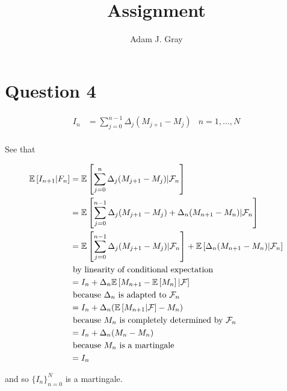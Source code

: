 \documentclass{unswmaths}
\begin{document}
\author{Adam J. Gray}
\subject{Number Theory}
\title{Assignment}

\unswtitle

\section{Question 4}

\begin{align*}
	I_n &= \sum_{j=0}^{n-1} \Delta_j (M_{j+1} - M_j) & n = 1,\ldots, N \\
\end{align*}

See that

\begin{align*}
	\mathbb{E} \left[ I_{n+1} | F_n  \right] &= \mathbb{E} \left[ \sum_{j=0}^{n} \Delta_j (M_{j+1} - M_j) | \mathcal{F}_n \right] \\
		&= \mathbb{E} \left[ \sum_{j=0}^{n-1} \Delta_j (M_{j+1} - M_j) + \Delta_n(M_{n+1} - M_{n}) | \mathcal{F}_n \right] \\
		&= \mathbb{E} \left[ \sum_{j=0}^{n-1} \Delta_j (M_{j+1} - M_j) | \mathcal{F}_n \right] + \mathbb{E} \left[ \Delta_n(M_{n+1} - M_{n}) | \mathcal{F}_n \right] \\
		& \text{ by linearity of conditional expectation } \\
		&= I_n + \Delta_n \mathbb{E} \left[ M_{n+1} - \mathbb{E} \left[ M_n \right] | \mathcal{F} \right] \\
		& \text{ because } \Delta_n \text{ is adapted to } \mathcal{F}_n \\
		&= I_n + \Delta_n (\mathbb{E} \left[ M_{n+1} | \mathcal{F} \right] - M_n) \\
		& \text{ because } M_n \text{ is completely determined by } \mathcal{F}_n \\
		&= I_n + \Delta_n (M_n - M_n) \\
		& \text{ because } M_n \text{ is a martingale } \\
		&= I_n
\end{align*}

and so $ \{ I_n \}_{n=0}^{N} $ is a martingale.
\end{document}
